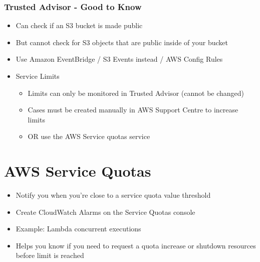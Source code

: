 \subsubsection{Trusted Advisor - Good to Know}
\begin{itemize}
    \item Can check if an S3 bucket is made public
    \item But cannot check for S3 objects that are public inside of your bucket
    \item Use Amazon EventBridge / S3 Events instead / AWS Config Rules

    \item Service Limits
    \begin{itemize}
        \item Limits can only be monitored in Trusted Advisor (cannot be changed)
        \item Cases must be created manually in AWS Support Centre to increase limits
        \item OR use the AWS Service quotas service
    \end{itemize}
\end{itemize}


\section{AWS Service Quotas}
\begin{itemize}
    \item Notify you when you're close to a service quota value threshold
    \item Create CloudWatch Alarms on the Service Quotas console
    \item Example: Lambda concurrent executions
    \item Helps you know if you need to request a quota increase or shutdown resources before limit is reached
\end{itemize}


